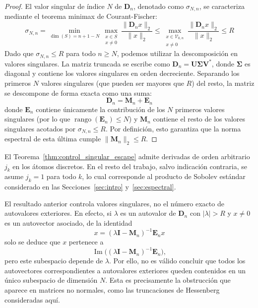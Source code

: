 \begin{proof}
	El valor singular de índice $N$ de $\mathbf{D}_n$, denotado como $\sigma_{N,n}$, se caracteriza mediante el teorema minimax de Courant-Fischer:
	\begin{equation}
		\sigma_{N,n} = \min_{\dim(S) = n+1-N} \max_{\substack{x \in S \\ x \neq 0}} \frac{\|\mathbf{D}_n x\|_2}{\|x\|_2} \le \max_{\substack{x \in \mathcal{V}_{0,n} \\ x \neq 0}} \frac{\|\mathbf{D}_n x\|_2}{\|x\|_2} \le R
	\end{equation}
	Dado que $\sigma_{N,n} \le R$ para todo $n \ge N$, podemos utilizar la descomposición en valores singulares. La matriz truncada se escribe como $\mathbf{D}_n = \mathbf{U} \mathbf{\Sigma} \mathbf{V}^*$, donde $\mathbf{\Sigma}$ es diagonal y contiene los valores singulares en orden decreciente.
	Separando los primeros $N$ valores singulares (que pueden ser mayores que $R$) del resto, la matriz se descompone de forma exacta como una suma:
	$$ \mathbf{D}_n = \mathbf{M}_n + \mathbf{E}_n $$
	donde $\mathbf{E}_n$ contiene únicamente la contribución de los $N$ primeros valores singulares (por lo que $\operatorname{rango}(\mathbf{E}_n) \le N$) y $\mathbf{M}_n$ contiene el resto de los valores singulares acotados por $\sigma_{N,n} \le R$. Por definición, esto garantiza que la norma espectral de esta última cumple $\|\mathbf{M}_n\|_2 \le R$.
\end{proof}

\begin{rmk}
	El Teorema~\ref{thm:control_singular_escape} admite derivadas de orden arbitrario $j_k$ en los átomos discretos. En el resto del trabajo, salvo indicación contraria, se asume $j_k=1$ para todo $k$, lo cual corresponde al producto de Sobolev estándar considerado en las Secciones~\ref{sec:intro} y~\ref{sec:espectral}.
\end{rmk}

\begin{rmk}
	El resultado anterior controla valores singulares, no el número exacto de autovalores exteriores. En efecto, si $\lambda$ es un autovalor de $\mathbf{D}_n$ con $|\lambda| > R$ y $x \neq 0$ es un autovector asociado, de la identidad
	\begin{equation}\label{eq:autovector_escape}
		x = (\lambda \mathbf{I} - \mathbf{M}_n)^{-1} \mathbf{E}_n x
	\end{equation}
	solo se deduce que $x$ pertenece a
	\[
		\operatorname{Im}\bigl((\lambda \mathbf{I} - \mathbf{M}_n)^{-1} \mathbf{E}_n\bigr),
	\]
	pero este subespacio depende de $\lambda$. Por ello, no es válido concluir que todos los autovectores correspondientes a autovalores exteriores queden contenidos en un único subespacio de dimensión $N$. Esta es precisamente la obstrucción que aparece en matrices no normales, como las truncaciones de Hessenberg consideradas aquí.
\end{rmk}

